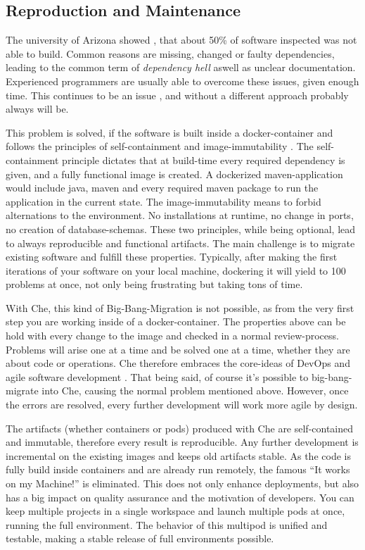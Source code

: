 \documentclass[utf8]{lni}
\begin{document}
\subsection{Reproduction and Maintenance}
The university of Arizona showed \cite{CO16}, that about 50\% of software inspected was not able to build. 
Common reasons are missing, changed or faulty dependencies, leading to the common term of \textit{dependency hell} aswell as unclear documentation. 
Experienced programmers are usually able to overcome these issues, given enough time. This continues to be an issue \cite{CL14}, and without a different approach probably always will be. 

This problem is solved, if the software is built inside a docker-container and follows the principles of self-containment and image-immutability \cite{BI17}.
The self-containment principle dictates that  at build-time every required dependency is given, and a fully functional image is created.
A dockerized maven-application would include java, maven and every required maven package to run the application in the current state. 
The image-immutability means to forbid alternations to the environment. 
No installations at runtime, no change in ports, no creation of database-schemas.
These two principles, while being optional, lead to always reproducible and functional artifacts.
The main challenge is to migrate existing software and fulfill these properties. 
Typically, after making the first iterations of your software on your local machine, dockering it will yield to 100 problems at once, not only being frustrating but taking tons of time. 

With Che, this kind of Big-Bang-Migration is not possible, as from the very first step you are working inside of a docker-container.
The properties above can be hold with every change to the image and checked in a normal review-process. 
Problems will arise one at a time and be solved one at a time, whether they are about code or operations. 
Che therefore embraces the core-ideas of DevOps \cite{HUE12}\cite{JA16} and agile software development \cite{EBE16}.
That being said, of course it's possible to big-bang-migrate into Che, causing the normal problem mentioned above. 
However, once the errors are resolved, every further development will work more agile by design.

The artifacts (whether containers or pods) produced with Che are self-contained and immutable, therefore every result is reproducible. 
Any further development is incremental on the existing images and keeps old artifacts stable. 
As the code is fully build inside containers and are already run remotely, the famous “It works on my Machine!” is eliminated. 
This does not only enhance deployments, but also has a big impact on quality assurance and the motivation of developers. 
You can keep multiple projects in a single workspace and launch multiple pods at once, running the full environment. 
The behavior of this multipod is unified and testable, making a stable release of full environments possible. 
\end{document}
